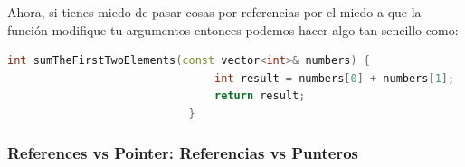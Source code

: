 \documentclass[12pt, fleqn]{report}                             %
\theoremstyle{break}                                            %
\begin{document}
\begin{itemize}
                        Ahora, si tienes miedo de pasar cosas por referencias por el miedo a que la 
                        función modifique tu argumentos entonces podemos hacer algo tan sencillo como:
                        \begin{lstlisting}[language=C++, gobble=28]
                            int sumTheFirstTwoElements(const vector<int>& numbers) {
                                int result = numbers[0] + numbers[1];
                                return result;
                            }
                        \end{lstlisting}
                        
                \end{itemize}

                \clearpage
                \subsubsection{References vs Pointer: Referencias vs Punteros}
\end{document}
